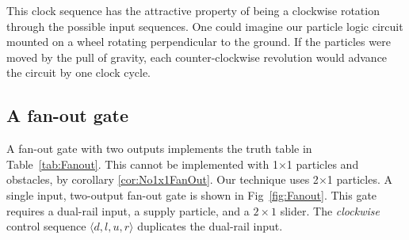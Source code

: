 \documentclass[letterpaper, 10 pt, conference]{ieeeconf}
\begin{document}
  

This clock sequence has the attractive property of being a clockwise rotation through the possible input sequences.  One could imagine our particle logic circuit mounted on a wheel rotating perpendicular to the ground. If the particles were moved by the pull of gravity, each counter-clockwise revolution would advance the circuit by one clock cycle.

\subsection{A {\sc fan-out} gate}\label{sec:FanOut}
A {\sc fan-out} gate with two outputs implements the truth table in Table~\ref{tab:Fanout}.  
This cannot be implemented with 1$\times$1 particles and obstacles, by corollary \ref{cor:No1x1FanOut}.   Our technique uses 2$\times$1 particles.   A single input, two-output {\sc fan-out} gate is shown in Fig~\ref{fig:Fanout}.  This gate requires a dual-rail input, a supply particle, and a $2\times 1$ slider.  The  \emph{clockwise} control sequence $\langle d,l,u,r \rangle$  duplicates the dual-rail input.
\end{document}
